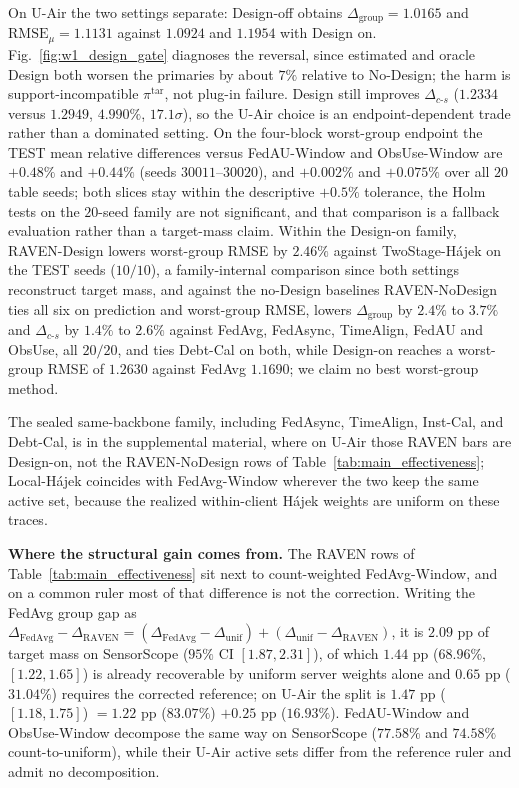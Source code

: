 \documentclass[letterpaper,journal]{IEEEtran}
\begin{document}
On U-Air the two settings separate: Design-off obtains
$\Delta_{\mathrm{group}}=1.0165$ and $\mathrm{RMSE}_{\mu}=1.1131$ against
$1.0924$ and $1.1954$ with Design on.  Fig.~\ref{fig:w1_design_gate} diagnoses
the reversal, since estimated and oracle Design both worsen the primaries by
about $7\%$ relative to No-Design; the harm is support-incompatible
$\pi^{\mathrm{tar}}$, not plug-in failure.  Design still improves
$\Delta_{c\text{-}s}$ ($1.2334$ versus $1.2949$, $4.990\%$, $17.1\sigma$), so the
U-Air choice is an endpoint-dependent trade rather than a dominated setting.  On
the four-block worst-group endpoint the TEST mean relative differences versus
FedAU-Window and ObsUse-Window are $+0.48\%$ and $+0.44\%$ (seeds
$30011$--$30020$), and $+0.002\%$ and $+0.075\%$ over all $20$ table seeds; both
slices stay within the descriptive $+0.5\%$ tolerance, the Holm tests on the
$20$-seed family are not significant, and that comparison is a fallback
evaluation rather than a target-mass claim.  Within the Design-on family,
RAVEN-Design lowers worst-group RMSE by $2.46\%$ against TwoStage-H\'ajek on the
TEST seeds ($10/10$), a family-internal comparison since both settings
reconstruct target mass, and against the no-Design baselines RAVEN-NoDesign ties
all six on prediction and worst-group RMSE, lowers $\Delta_{\mathrm{group}}$ by
$2.4\%$ to $3.7\%$ and $\Delta_{c\text{-}s}$ by $1.4\%$ to $2.6\%$ against
FedAvg, FedAsync, TimeAlign, FedAU and ObsUse, all $20/20$, and ties Debt-Cal on
both, while Design-on reaches a worst-group RMSE of $1.2630$ against FedAvg
$1.1690$; we claim no best worst-group method.

The sealed same-backbone family, including FedAsync, TimeAlign, Inst-Cal, and
Debt-Cal, is in the supplemental material, where on U-Air those RAVEN bars are
Design-on, not the RAVEN-NoDesign rows of Table~\ref{tab:main_effectiveness};
Local-H\'ajek coincides with FedAvg-Window wherever the two keep the same active
set, because the realized within-client H\'ajek weights are uniform on these
traces.

\noindent\textbf{Where the structural gain comes from.}
The RAVEN rows of Table~\ref{tab:main_effectiveness} sit next to count-weighted
FedAvg-Window, and on a common ruler most of that difference is not the
correction.  Writing the FedAvg group gap as
$\Delta_{\mathrm{FedAvg}}-\Delta_{\mathrm{RAVEN}}
=(\Delta_{\mathrm{FedAvg}}-\Delta_{\mathrm{unif}})
+(\Delta_{\mathrm{unif}}-\Delta_{\mathrm{RAVEN}})$, it is $2.09$ pp of target
mass on SensorScope ($95\%$ CI $[1.87,2.31]$), of which $1.44$ pp
($68.96\%$, $[1.22,1.65]$) is already recoverable by uniform server weights
alone and $0.65$ pp ($31.04\%$) requires the corrected reference; on U-Air the
split is $1.47$ pp ($[1.18,1.75]$) $=1.22$ pp ($83.07\%$) $+0.25$ pp
($16.93\%$).  FedAU-Window and ObsUse-Window decompose the same way on
SensorScope ($77.58\%$ and $74.58\%$ count-to-uniform), while their U-Air active
sets differ from the reference ruler and admit no decomposition.
\end{document}
